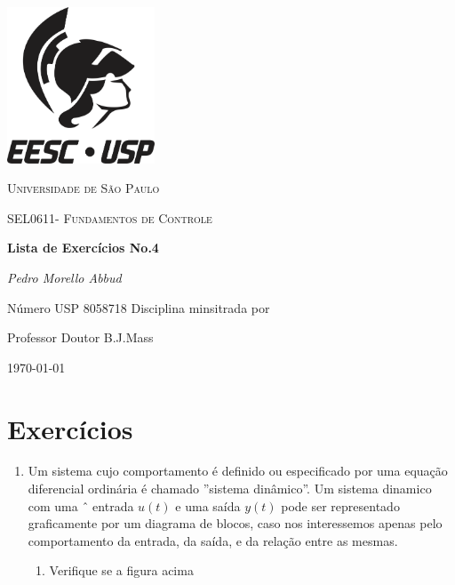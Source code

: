 \documentclass[12pt,a4paper]{article}
\begin{document}
\begin{titlepage}
  \centering
  \includegraphics[width=0.33\textwidth]{usp}\par\vspace{1cm}
  {\scshape\LARGE Universidade de São Paulo\par}
  \vspace{1cm}
  {\scshape\Large SEL0611- Fundamentos de Controle\par}
  \vspace{1.5cm}
  {\huge\bfseries Lista de Exercícios No.4\par}
  \vspace{2cm}
  {\Large\itshape Pedro Morello Abbud \par}
  \vspace{1cm}
  Número USP 8058718
  \vfill
  Disciplina minsitrada por\par
  Professor Doutor B.J.Mass

  \vfill 
  {\large \today\par}
\end{titlepage}
\newpage
\section*{Exercícios}
\begin{enumerate}
  \item  Um sistema cujo comportamento é definido ou especificado por uma equação 
    diferencial ordinária é chamado ”sistema dinâmico”. Um sistema dinamico com uma ˆ
entrada $u(t)$ e uma saída $y(t)$ pode ser representado graficamente por um diagrama
de blocos, caso nos interessemos apenas pelo comportamento da entrada, da saída,
e da relação entre as mesmas.
\begin{enumerate}[label=(\alph*)]
    \begin{figure}
    \[
\xymatrix{
  \ar[r]^{Input}& *++[F]{EDO}\ar[r]   
}
\]
\end{figure}
  \item Verifique se a figura acima
\end{enumerate}
\end{enumerate}
\end{document}
